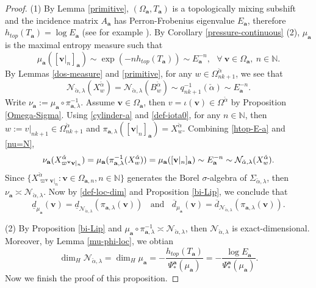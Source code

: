 \documentclass[reqno,11pt,graphicx,]{amsart}
\numberwithin{equation}{section}
\theoremstyle{plain}
\newcommand{\N}{{\mathbb N}}
\newcommand{\3}{\mathbf{3}}
\newcommand{\ma}{\mathbf{a}}
\newcommand{\mv}{\mathbf{v}}
\begin{document}
	\begin{proof}
		(1)	By Lemma \ref{primitive}, $(\Omega_{\ma},T_{\ma})$ is a topologically mixing subshift and the incidence matrix $A_{\ma}$ has Perron-Frobenius eigenvalue $E_{\ma}$, therefore $h_{top}(T_{\ma})=\log E_{\ma}$ (see for example \cite{Wa1982}). By Corollary \ref{pressure-continuous} (2), $\mu_{\ma}$ is the maximal entropy measure such that 
		\begin{equation}\label{htop-E-a}
			\mu_{\ma}([\mv|_n]_{\ma})\sim \exp(-nh_{top}(T_{\ma}))\sim E_{\ma}^{-n},\ \ \ \forall\ \mv\in\Omega_{\ma},\ n\in\N.
		\end{equation}
		By Lemmas \ref{dos-measure} and \ref{primitive}, for any $w\in\Omega^{\check{\alpha}}_{nk+1}$, we see that
		\begin{equation}\label{nu=N}
			\mathcal{N}_{\check{\alpha},\lambda}(X_{w}^{\check{\alpha}})=\mathcal{N}_{\check{\alpha},\lambda}(B^{\check{\alpha}}_{w})\sim q_{nk+1}^{-1}(\check{\alpha})\sim E_{\ma}^{-n}.
		\end{equation}
		Write $\nu_{\mathbf{a}}:=\mu_{\mathbf{a}%
		}\circ\pi_{\ma,\lambda}^{-1}$. Assume $\mv\in\Omega_{\mathbf{a}}$, then $v=\iota(\mv)\in\Omega^{\check{\alpha}}$ by Proposition \ref{Omega-Sigma}. Using  \eqref{cylinder-a} and \eqref{def-iota0}, for any $n\in\N$, then $w:=v|_{nk+1}\in\Omega^{\check{\alpha}}_{nk+1}$ and  $\pi_{\ma,\lambda}([\mv|_n]_{\mathbf{a}})=X^{\check{\alpha}%
		}_{w}$. Combining \eqref{htop-E-a} and \eqref{nu=N}, 
		\begin{equation*}
			\nu_{\mathbf{a}}(X_{\varpi^{\mv}\mv|_n}^{\check{\alpha}})=\mu_{\mathbf{a}%
			}(\pi_{\ma,\lambda}^{-1}(X_{w}^{\check{\alpha}}))=\mu_{%
				\mathbf{a}}([\mv|_n]_{\mathbf{a}})\sim E_{\mathbf{a}}^{-n}\sim\mathcal{N}_{\check{%
					\alpha},\lambda}(X_{w}^{\check{\alpha}}).
		\end{equation*}
		Since $\{X_{\varpi^{\mv}\mv|_n}^{\check{\alpha}}:\mv\in\Omega_{\ma,n},n\in\N\}$ generates the Borel $\sigma$-algebra of $\Sigma_{\check{\alpha},\lambda}$, then $\nu_{\ma}\asymp\mathcal{N}_{\check{\alpha},\lambda}$. Now by \eqref{def-loc-dim} and Proposition \ref{bi-Lip}, we conclude that
		\begin{equation*}
			\underline{d}_{\mu_{\ma}}(\mv)=\underline{d}_{\mathcal{N}_{\check{\alpha},\lambda}}(\pi_{\ma,\lambda}(\mv))\ \ \ \ \text{and} \ \ \ \ \overline{d}_{\mu_{\ma}}(\mv)=\overline{d}_{\mathcal{N}_{\check{\alpha},\lambda}}(\pi_{\ma,\lambda}(\mv)).
		\end{equation*}	
		
		(2)	By Proposition \ref{bi-Lip} and $\mu_{\mathbf{a}}\circ\pi_{\ma,\lambda}^{-1}\asymp\mathcal{N}_{\check{\alpha},\lambda}$, then $\mathcal{N}_{\check{\alpha},\lambda}$ is exact-dimensional. Moreover, by Lemma \ref{mu-phi-loc}, we obtian 
		\begin{equation*}
			\dim_H\mathcal{N}_{\check{\alpha},\lambda}=\dim_H\mu_{\ma}=-\frac{h_{top}(T_{\ma})}{\Psi^{\ma}_*(\mu_{\ma})}=-\frac{\log E_{\ma}}{\Psi^{\ma}_*(\mu_{\ma})}.
		\end{equation*}	
		Now we finish the proof of this proposition.
	\end{proof}
\end{document}
